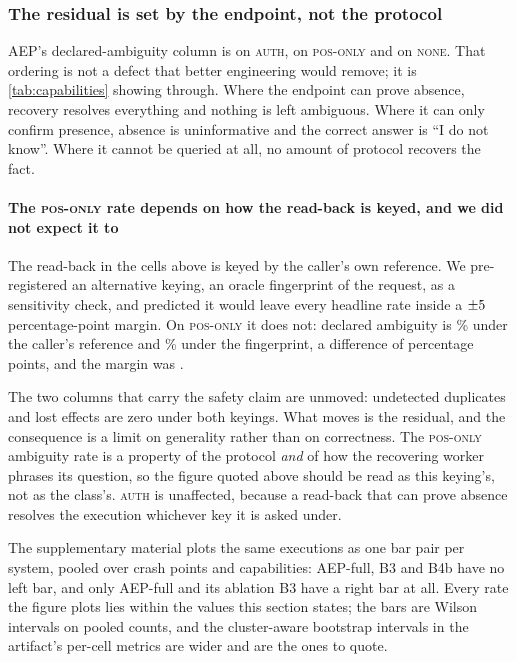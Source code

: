 \subsubsection{The residual is set by the endpoint, not the protocol}

AEP's declared-ambiguity column is \AepAmbAuth{} on \textsc{auth},
\AepAmbPosOnly{} on \textsc{pos-only} and \AepAmbNoReadback{} on
\textsc{none}. That ordering is not a defect that better engineering would
remove; it is \cref{tab:capabilities} showing through. Where the endpoint can
prove absence, recovery resolves everything and nothing is left ambiguous.
Where it can only confirm presence, absence is uninformative and the correct
answer is ``I do not know''. Where it cannot be queried at all, no amount of
protocol recovers the fact.

\paragraph{The \textsc{pos-only} rate depends on how the read-back is keyed, and
we did not expect it to} The read-back in the cells above is keyed by the
caller's own reference. We pre-registered an alternative keying, an oracle
fingerprint of the request, as a sensitivity check, and predicted it would
leave every headline rate inside a $\pm5{}$ percentage-point
margin. On \textsc{pos-only} it does not: declared ambiguity is
\KeyingAmbiguityCaller{}\% under the caller's reference and
\KeyingAmbiguityOracle{}\% under the fingerprint, a difference of
\KeyingAmbiguityDelta{} percentage points, and the margin was
\BthreeVsAepAmbMargin{}.

The two columns that carry the safety claim are unmoved: undetected duplicates
and lost effects are zero under both keyings. What moves is the residual, and
the consequence is a limit on generality rather than on correctness. The
\textsc{pos-only} ambiguity rate is a property of the protocol \emph{and} of how
the recovering worker phrases its question, so the figure quoted above should
be read as this keying's, not as the class's. \textsc{auth} is unaffected,
because a read-back that can prove absence resolves the execution whichever key
it is asked under.

The supplementary material plots the same executions as one bar pair per system,
pooled over crash points and capabilities: AEP-full, B3 and B4b have no left
bar, and only AEP-full and its ablation B3 have a right bar at all.
Every rate the figure plots lies within the values this section states; the
bars are Wilson
intervals on pooled counts, and the cluster-aware bootstrap intervals in the artifact's
per-cell metrics are wider and are the ones to quote.

